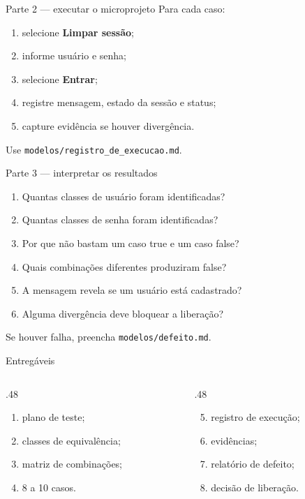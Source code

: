\begin{frame}{Parte 2 — executar o microprojeto}
  Para cada caso:
  \begin{enumerate}
    \item selecione \textbf{Limpar sessão};
    \item informe usuário e senha;
    \item selecione \textbf{Entrar};
    \item registre mensagem, estado da sessão e status;
    \item capture evidência se houver divergência.
  \end{enumerate}
  \vspace{4mm}

  Use \texttt{modelos/registro\_de\_execucao.md}.
\end{frame}

\begin{frame}{Parte 3 — interpretar os resultados}
  \small
  \begin{enumerate}
    \item Quantas classes de usuário foram identificadas?
    \item Quantas classes de senha foram identificadas?
    \item Por que não bastam um caso true e um caso false?
    \item Quais combinações diferentes produziram false?
    \item A mensagem revela se um usuário está cadastrado?
    \item Alguma divergência deve bloquear a liberação?
  \end{enumerate}
  \vspace{3mm}

  Se houver falha, preencha \texttt{modelos/defeito.md}.
\end{frame}

\begin{frame}{Entregáveis}
  \begin{columns}[T,onlytextwidth]
    \begin{column}{.48\textwidth}
      \begin{enumerate}
        \item plano de teste;
        \item classes de equivalência;
        \item matriz de combinações;
        \item 8 a 10 casos.
      \end{enumerate}
    \end{column}
    \begin{column}{.48\textwidth}
      \begin{enumerate}
        \setcounter{enumi}{4}
        \item registro de execução;
        \item evidências;
        \item relatório de defeito;
        \item decisão de liberação.
      \end{enumerate}
    \end{column}
  \end{columns}
\end{frame}

